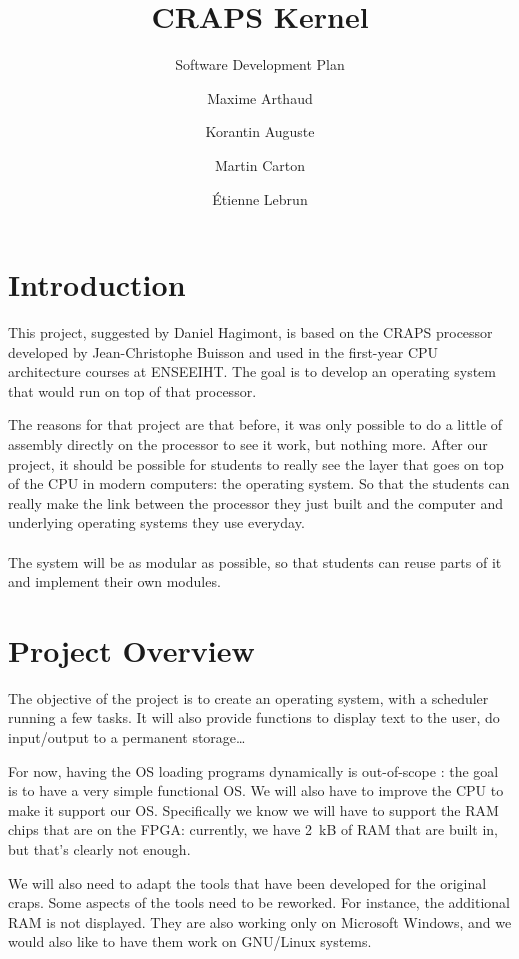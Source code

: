 \documentclass{article}
\title{CRAPS Kernel}
\subtitle{Software Development Plan}
\author{
       Maxime Arthaud
  \and Korantin Auguste
  \and Martin Carton
  \and Étienne Lebrun
}
\begin{document}
  
  \tableofcontents
  \newpage

  \section{Introduction}
    This project, suggested by Daniel Hagimont, is based on the CRAPS processor
    developed by Jean-Christophe Buisson and used in the first-year CPU
    architecture courses at ENSEEIHT. The goal is to develop an operating
    system that would run on top of that processor.

    The reasons for that project are that before, it was only possible to do a
    little of assembly directly on the processor to see it work, but nothing
    more.  After our project, it should be possible for students to really see
    the layer that goes on top of the CPU in modern computers: the operating
    system. So that the students can really make the link between the processor
    they just built and the computer and underlying operating systems they use
    everyday.

    \paragraph{}
    The system will be as modular as possible, so that students can reuse parts
    of it and implement their own modules.

  \section{Project Overview}
    The objective of the project is to create an operating system, with a
    scheduler running a few tasks. It will also provide functions to display
    text to the user, do input/output to a permanent storage\dots

    For now, having the OS loading programs dynamically is out-of-scope : the
    goal is to have a very simple functional OS.  We will also have to improve
    the CPU to make it support our OS. Specifically we know we will have to
    support the RAM chips that are on the FPGA: currently, we have \SI{2}{kB}
    of RAM that are built in, but that's clearly not enough.

    We will also need to adapt the tools that have been developed for the
    original craps. Some aspects of the tools need to be reworked. For
    instance, the additional RAM is not displayed. They are also working only on
    Microsoft Windows, and we would also like to have them work on GNU/Linux
    systems.
\end{document}
